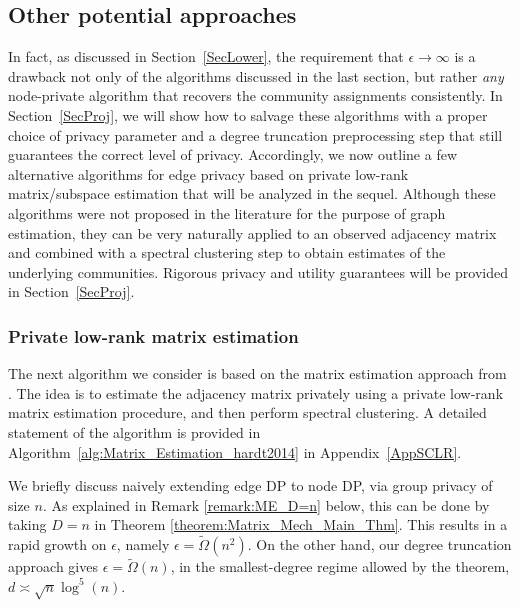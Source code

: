 \documentclass{article}
\begin{document}


\subsection{Other potential approaches}

In fact, as discussed in Section~\ref{SecLower}, the requirement that $\epsilon \rightarrow \infty$ is a drawback not only of the algorithms discussed in the last section, but rather \emph{any} node-private algorithm that recovers the community assignments consistently. In Section~\ref{SecProj}, we will show how to salvage these algorithms with a proper choice of privacy parameter and a degree truncation preprocessing step that still guarantees the correct level of privacy. Accordingly, we now outline a few alternative algorithms for edge privacy based on private low-rank matrix/subspace estimation that will be analyzed in the sequel. Although these algorithms were not proposed in the literature for the purpose of graph estimation, they can be very naturally applied to an observed adjacency matrix and combined with a spectral clustering step to obtain estimates of the underlying communities. Rigorous privacy and utility guarantees will be provided in Section~\ref{SecProj}.


\subsubsection{Private low-rank matrix estimation}

The next algorithm we consider is based on the matrix estimation approach from \cite{hardt2014noisy}. The idea is to estimate the adjacency matrix privately using a private low-rank matrix estimation procedure, and then perform spectral clustering. A detailed statement of the algorithm is provided in Algorithm~\ref{alg:Matrix_Estimation_hardt2014} in Appendix~\ref{AppSCLR}.

We briefly discuss naively extending edge DP to node DP, via group privacy of size $n$. As explained in Remark \ref{remark:ME_D=n} below, this can be done by taking $D = n$ in Theorem \ref{theorem:Matrix_Mech_Main_Thm}. This results in a rapid growth on $\epsilon$, namely $\epsilon = \widetilde{\Omega}(n^2)$. On the other hand, our degree truncation approach gives $\epsilon = \widetilde{\Omega}(n)$, in the smallest-degree regime allowed by the theorem, $d \asymp \sqrt{n}\log^5(n)$.
\end{document}
